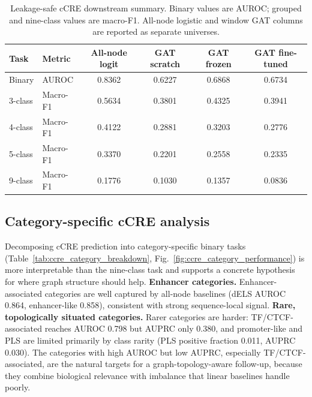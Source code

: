 \IfFileExists{ws-procs11x85.cls}{\worldscientificclasstrue\documentclass{ws-procs11x85}}{\worldscientificclassfalse\documentclass[11pt]{article}\usepackage[margin=1in]{geometry}}
\providecommand{\tbl}[2]{\caption{#1}#2}
\providecommand{\toprule}{\hline}
\providecommand{\colrule}{\hline}
\providecommand{\botrule}{\hline}
\begin{document}
\begin{table}[t]
\tbl{Leakage-safe cCRE downstream summary. Binary values are AUROC; grouped and
nine-class values are macro-F1. All-node logistic and window GAT columns are
reported as separate universes.}
{\small
\begin{tabular}{@{}llcccc@{}}
\toprule
Task & Metric & All-node logit & GAT scratch & GAT frozen & GAT fine-tuned\\
\colrule
Binary & AUROC & 0.8362 & 0.6227 & 0.6868 & 0.6734\\
3-class & Macro-F1 & 0.5634 & 0.3801 & 0.4325 & 0.3941\\
4-class & Macro-F1 & 0.4122 & 0.2881 & 0.3203 & 0.2776\\
5-class & Macro-F1 & 0.3370 & 0.2201 & 0.2558 & 0.2335\\
9-class & Macro-F1 & 0.1776 & 0.1030 & 0.1357 & 0.0836\\
\botrule
\end{tabular}}
\label{tab:ccre_results}
\end{table}

\FloatBarrier

\subsection{Category-specific cCRE analysis}

Decomposing cCRE prediction into category-specific binary tasks
(Table~\ref{tab:ccre_category_breakdown},
Fig.~\ref{fig:ccre_category_performance}) is more interpretable than the
nine-class task and supports a concrete hypothesis for where graph structure
should help. \textbf{Enhancer categories.} Enhancer-associated categories are
well captured by all-node baselines (dELS AUROC 0.864, enhancer-like 0.858),
consistent with strong sequence-local signal. \textbf{Rare, topologically
situated categories.} Rarer categories are harder: TF/CTCF-associated reaches
AUROC 0.798 but AUPRC only 0.380, and promoter-like and PLS are limited
primarily by class rarity (PLS positive fraction 0.011, AUPRC 0.030). The
categories with high AUROC but low AUPRC, especially TF/CTCF-associated, are the
natural targets for a graph-topology-aware follow-up, because they combine
biological relevance with imbalance that linear baselines handle poorly.
\end{document}
